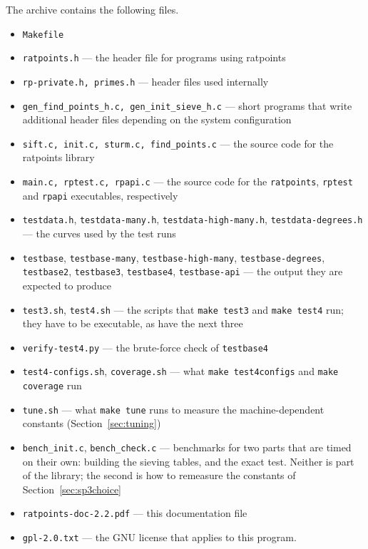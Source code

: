 \documentclass[12pt,a4paper,oneside]{amsart}
\begin{document}
The archive contains the following files.
\begin{itemize}
  \item \texttt{Makefile}
  \item \texttt{ratpoints.h} --- the header file for programs using ratpoints
  \item \texttt{rp-private.h, primes.h} --- header files used internally
  \item \texttt{gen\_find\_points\_h.c, gen\_init\_sieve\_h.c} ---
        short programs that write additional header files depending
        on the system configuration
  \item \texttt{sift.c, init.c, sturm.c, find\_points.c} ---
        the source code for the ratpoints library
  \item \texttt{main.c, rptest.c, rpapi.c} --- the source code for the
        \texttt{ratpoints}, \texttt{rptest} and \texttt{rpapi} executables,
        respectively
  \item \texttt{testdata.h}, \texttt{testdata-many.h},
        \texttt{testdata-high-many.h}, \texttt{testdata-degrees.h} ---
        the curves used by the test runs
  \item \texttt{testbase}, \texttt{testbase-many},
        \texttt{testbase-high-many}, \texttt{testbase-degrees},
        \texttt{testbase2}, \texttt{testbase3}, \texttt{testbase4},
        \texttt{testbase-api} --- the output they are expected to produce
  \item \texttt{test3.sh}, \texttt{test4.sh} --- the scripts that
        \texttt{make test3} and \texttt{make test4} run; they have to be
        executable, as have the next three
  \item \texttt{verify-test4.py} --- the brute-force check of
        \texttt{testbase4}
  \item \texttt{test4-configs.sh}, \texttt{coverage.sh} --- what
        \texttt{make test4configs} and \texttt{make coverage} run
  \item \texttt{tune.sh} --- what \texttt{make tune} runs to measure the
        machine-dependent constants (Section~\ref{sec:tuning})
  \item \texttt{bench\_init.c}, \texttt{bench\_check.c} --- benchmarks for
        two parts that are timed on their own: building the sieving tables,
        and the exact test.  Neither is part of the library; the second is
        how to remeasure the constants of Section~\ref{sec:sp3choice}
  \item \texttt{ratpoints-doc-2.2.pdf} --- this documentation file
  \item \texttt{gpl-2.0.txt} --- the GNU license that applies to this program.
\end{itemize}
\end{document}
